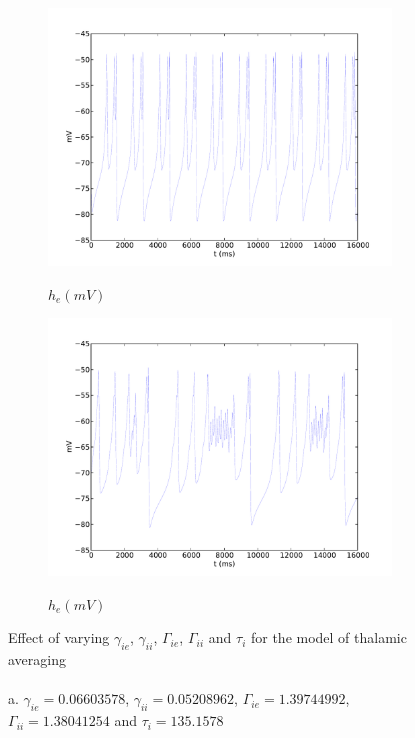 \documentclass[a4paper,12pt]{article}
\begin{document}
\begin{figure}
\begin{subfigure}[b]{0.5\textwidth}
		\includegraphics[scale=0.35]{chosen-frontiers-2012/00143-1-0_4-6-he-thal.pdf}
		\label{fig:00143_c}
		\caption{$h_e (mV)$}
	\end{subfigure}
	\begin{subfigure}[b]{0.5\textwidth}
		\includegraphics[scale=0.35]{chosen-frontiers-2012/00143-1-1-5-he-thal.pdf}
		\label{fig:00143_d}
		\caption{$h_e (mV)$}
	\end{subfigure}
	\label{fig:00143}
	\caption{Effect of varying $\gamma_{ie}$, $\gamma_{ii}$, $\Gamma_{ie}$, $\Gamma_{ii}$ and $\tau_i$ for the model of thalamic averaging\\
\\
a. $\gamma_{ie} = 0.06603578$, $\gamma_{ii} = 0.05208962$, $\Gamma_{ie} = 1.39744992$, $\Gamma_{ii} = 1.38041254$ and $\tau_i = 135.1578$ \\
}
\end{figure}
\end{document}
